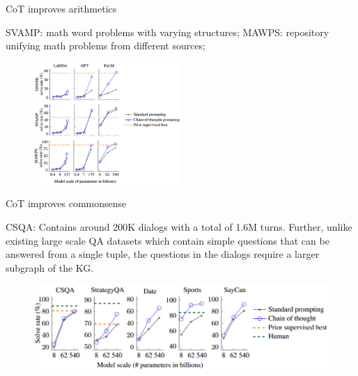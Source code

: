 
\begin{vbframe}{CoT improves arithmetics}


SVAMP: math word problems with varying structures; MAWPS:
repository unifying math problems from different sources;

\begin{figure}
    \centering
    \includegraphics[width=0.5\textwidth]{figure/cot_performance1.png}
\end{figure}


\end{vbframe}


\begin{vbframe}{CoT improves commonsense}

\vfill

CSQA: Contains around 200K dialogs with a total of 1.6M
turns. Further, unlike existing large scale QA datasets
which contain simple questions that can be answered from a
single tuple, the questions in the dialogs require a larger
subgraph of the KG. 


\begin{figure}
    \centering
    \includegraphics{figure/cot_performance2.png}\\
\end{figure}

\vfill

\end{vbframe}

